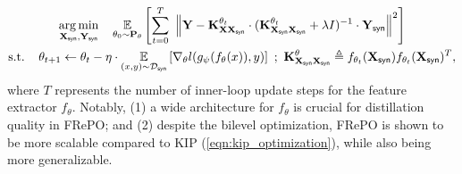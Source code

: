 \documentclass[10pt]{article} %
\begin{document}
\begin{equation} \label{eqn:frepo_optimization}
\begin{gathered}
    \underset{\mathbf{X}_{\mathsf{syn}}, \mathbf{Y}_{\mathsf{syn}}}{\operatorname{arg} \operatorname{min}} \hspace{0.4cm} 
    \underset{\theta_0 \sim \mathbf{P}_\theta}{\mathbb{E}} \left[\sum_{t=0}^T ~ \left\lVert \mathbf{Y} - \mathbf{K}^{\theta_t}_{\mathbf{X} \mathbf{X}_{\mathsf{syn}}} \cdot (\mathbf{K}^{\theta_t}_{\mathbf{X}_{\mathsf{syn}} \mathbf{X}_{\mathsf{syn}}} + \lambda I)^{-1} \cdot \mathbf{Y}_{\mathsf{syn}} \right\rVert^2\right] \\
    \text{s.t.} \hspace{0.4cm} \theta_{t+1} \leftarrow \theta_t - \eta \cdot \underset{(x, y) \sim \mathcal{D}_{\mathsf{syn}}}{\mathbb{E}} \left[\nabla_\theta l(g_{\psi}(f_{\theta}(x)), y)\right] ~;~ \mathbf{K}^{\theta}_{\mathbf{X}_{\mathsf{syn}} \mathbf{X}_{\mathsf{syn}}} \triangleq f_{\theta_t}(\mathbf{X}_{\mathsf{syn}}) f_{\theta_t}(\mathbf{X}_{\mathsf{syn}})^T,
\end{gathered}
\end{equation}
where $T$ represents the number of inner-loop update steps for the feature extractor $f_\theta$. Notably, (1) a wide architecture for $f_\theta$ is crucial for distillation quality in FRePO; and (2) despite the bilevel optimization, FRePO is shown to be more scalable compared to KIP (\cref{eqn:kip_optimization}), while also being more generalizable.


\end{document}
